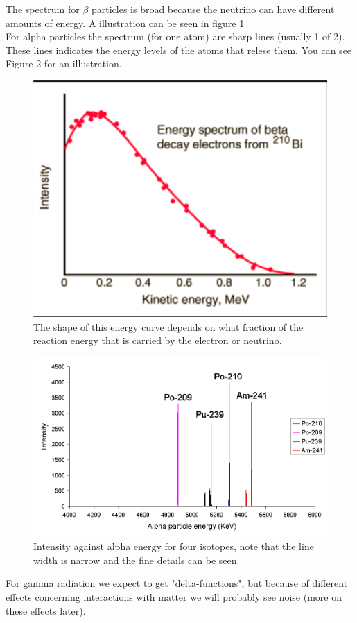 \documentclass[]{article}
\begin{document}
The spectrum for $\beta$ particles is broad because the neutrino can have different amounts of energy. A illustration can be seen in figure 1 \\ For alpha particles the spectrum (for one atom) are sharp lines (usually 1 of 2). These lines indicates the energy levels of the atoms that relese them. You can see Figure 2 for an illustration.
\begin{figure}
	\includegraphics[width=\linewidth]{beta-decay-spectrum.png}
	\caption{The shape of this energy curve depends on what fraction of the reaction energy that is carried by the electron or neutrino.}
	\label{fig:beta spectrum}
\end{figure}
\begin{figure}
	\includegraphics[width=\linewidth]{Alpha1spec.png}
	\caption{Intensity against alpha energy for four isotopes, note that the line width is narrow and the fine details can be seen}
	\label{fig:Alpha spectrum}
\end{figure}
For gamma radiation we expect to get "delta-functions", but because of different effects concerning interactions with matter we will probably see noise (more on these effects later).
\end{document}
